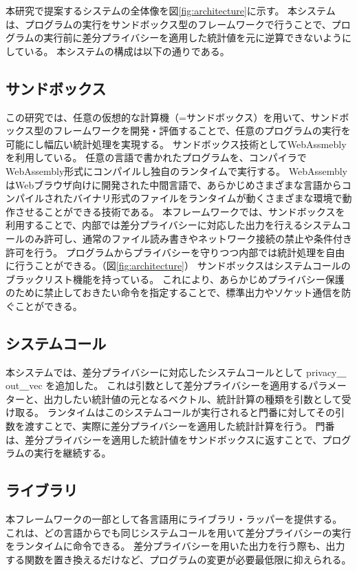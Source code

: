 \documentclass[a4paper,11pt]{jreport}
\begin{document}
本研究で提案するシステムの全体像を図\ref{fig:architecture}に示す。
本システムは、プログラムの実行をサンドボックス型のフレームワークで行うことで、プログラムの実行前に差分プライバシーを適用した統計値を元に逆算できないようにしている。
本システムの構成は以下の通りである。

\subsection{サンドボックス}

この研究では、任意の仮想的な計算機（=サンドボックス）を用いて、サンドボックス型のフレームワークを開発・評価することで、任意のプログラムの実行を可能にし幅広い統計処理を実現する。
サンドボックス技術としてWebAssmeblyを利用している。
任意の言語で書かれたプログラムを、コンパイラでWebAssembly形式にコンパイルし独自のランタイムで実行する。
WebAssemblyはWebブラウザ向けに開発された中間言語で、あらかじめさまざまな言語からコンパイルされたバイナリ形式のファイルをランタイムが動くさまざまな環境で動作させることができる技術である。
本フレームワークでは、サンドボックスを利用することで、内部では差分プライバシーに対応した出力を行えるシステムコールのみ許可し、通常のファイル読み書きやネットワーク接続の禁止や条件付き許可を行う。
プログラムからプライバシーを守りつつ内部では統計処理を自由に行うことができる。（図\ref{fig:architecture}）
サンドボックスはシステムコールのブラックリスト機能を持っている。
これにより、あらかじめプライバシー保護のために禁止しておきたい命令を指定することで、標準出力やソケット通信を防ぐことができる。

\subsection{システムコール}

本システムでは、差分プライバシーに対応したシステムコールとして privacy＿out＿vec を追加した。
これは引数として差分プライバシーを適用するパラメーターと、出力したい統計値の元となるベクトル、統計計算の種類を引数として受け取る。
ランタイムはこのシステムコールが実行されると門番に対してその引数を渡すことで、実際に差分プライバシーを適用した統計計算を行う。
門番は、差分プライバシーを適用した統計値をサンドボックスに返すことで、プログラムの実行を継続する。

\subsection{ライブラリ}

本フレームワークの一部として各言語用にライブラリ・ラッパーを提供する。
これは、どの言語からでも同じシステムコールを用いて差分プライバシーの実行をランタイムに命令できる。
差分プライバシーを用いた出力を行う際も、出力する関数を置き換えるだけなど、プログラムの変更が必要最低限に抑えられる。
\end{document}
